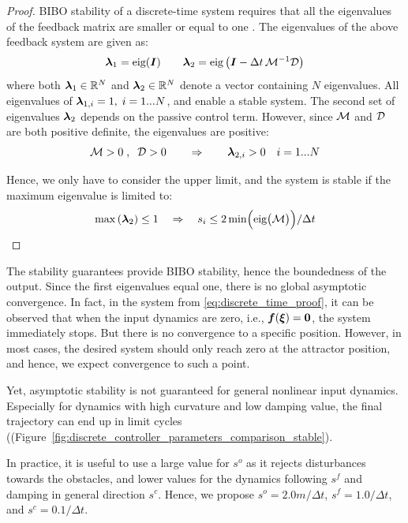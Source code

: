 \begin{proof}
BIBO stability of a discrete-time system requires that all the eigenvalues of the feedback matrix are smaller or equal to one \parencite{friedland2012control}.
The eigenvalues of the above feedback system are given as:
\begin{equation}
	\boldsymbol{\lambda}_1 = \text{eig}(\boldsymbol{I}) \qquad \boldsymbol{\lambda}_2 = \text{eig} \left(\boldsymbol{I} - \Delta t \, \mathcal{M}^{-1} \mathcal{D} \right)
\end{equation}
where both $\boldsymbol{\lambda}_1 \in \mathbb{R}^N$ and $\boldsymbol{\lambda}_2 \in \mathbb{R}^N$ denote a vector containing $N$ eigenvalues.
All eigenvalues of $\boldsymbol{\lambda}_{1, i} = 1, \; i = 1...N$, and enable a stable system. 
The second set of eigenvalues $\boldsymbol{\lambda}_2$  depends on the passive control term. 
However, since $\mathcal{M}$ and $\mathcal{D}$ are both positive definite, the eigenvalues are positive:
\begin{equation}
	\mathcal{M} > 0 \; , \;\; \mathcal{D} > 0 
	\qquad \Rightarrow \qquad
	\boldsymbol{\lambda}_{2, i} > 0 \quad i = 1...N
\end{equation}

Hence, we only have to consider the upper limit, and the system is stable if the maximum eigenvalue is limited to:
\begin{equation}
	\max \left(\boldsymbol{\lambda}_2 \right) \leq 1 
	\quad \Rightarrow \quad
	s_{i} \leq 2 \min \Bigl( \text{eig}\bigl(\mathcal{M}\bigr)  \Bigr) / \Delta t
\end{equation}
\end{proof}

The stability guarantees provide BIBO stability, hence the boundedness of the output. 
Since the first eigenvalues equal one, there is no global asymptotic convergence. 
In fact, in the system from \eqref{eq:discrete_time_proof}, it can be observed that when the input dynamics are zero, i.e., $\boldsymbol{f}(\boldsymbol{\xi}) = \boldsymbol{0}$, the system immediately stops. But there is no convergence to a specific position.
However, in most cases, the desired system should only reach zero at the attractor position, and hence, we expect convergence to such a point.

\ifthesis
Yet, asymptotic stability is not guaranteed for general nonlinear input dynamics. Especially for dynamics with high curvature and low damping value, the final trajectory can end up in limit cycles ((Figure~\ref{fig:discrete_controller_parameters_comparison_stable}).
\fi

In practice, it is useful to use a large value for $s^{o}$ as it rejects disturbances towards the obstacles, and lower values for the dynamics following $s^{f}$ and damping in general direction $s^{c}$. Hence, we propose $s^{o} = 2.0 m / \Delta t$, $s^{f} = 1.0 / \Delta t$, and $s^c = 0.1 / \Delta t$.

